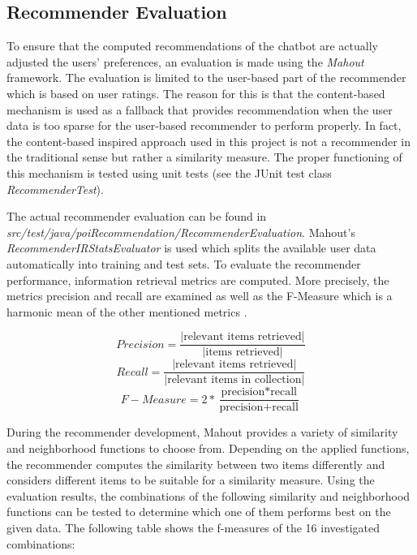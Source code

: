 \subsection{Recommender Evaluation} \label{ss:re}
To ensure that the computed recommendations of the chatbot are actually adjusted the users’ preferences, an evaluation is made using the \textit{Mahout} framework. The evaluation is limited to the user-based part of the recommender which is based on user ratings. The reason for this is that the content-based mechanism is used as a fallback that provides recommendation when the user data is too sparse for the user-based recommender to perform properly. In fact, the content-based inspired approach used in this project is not a recommender in the traditional sense but rather a similarity measure. The proper functioning of this mechanism is tested using unit tests (see the JUnit test class \textit{RecommenderTest}).

The actual recommender evaluation can be found in \textit{src/test/java/poiRecommendation/RecommenderEvaluation}. Mahout’s \textit{RecommenderIRStatsEvaluator} is used which splits the available user data automatically into training and test sets. To evaluate the recommender performance, information retrieval metrics are computed. More precisely, the metrics precision and recall are examined as well as the F-Measure which is a harmonic mean of the other mentioned metrics \cite{rijsbergen79}.

\begin{equation}
Precision=\frac{|\text{relevant items retrieved}|}{|\text{items retrieved}|}
\end{equation}
\begin{equation}
Recall=\frac{|\text{relevant items retrieved}|}{|\text{relevant items in collection}|}
\end{equation}
\begin{equation}
F-Measure=2 * \frac{\text{precision}*\text{recall}}{\text{precision}+\text{recall}}
\end{equation}

During the recommender development, Mahout provides a variety of similarity and neighborhood functions to choose from. Depending on the applied functions, the recommender computes the similarity between two items differently and considers different items to be suitable for a similarity measure. Using the evaluation results, the combinations of the following similarity and neighborhood functions can be tested to determine which one of them performs best on the given data.  The following table shows the f-measures of the 16 investigated combinations:

